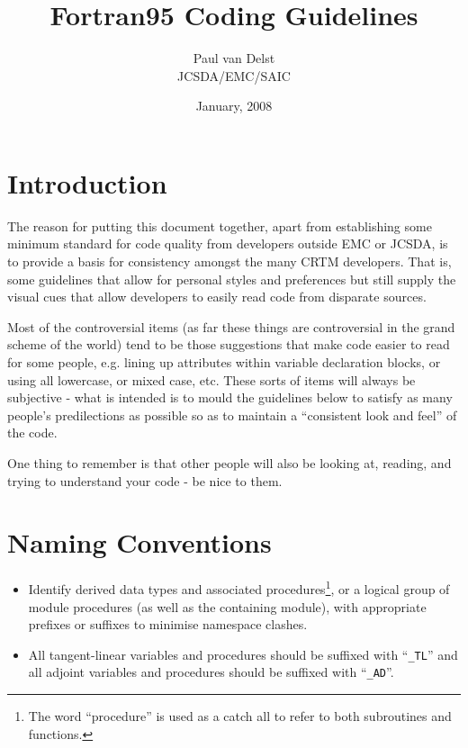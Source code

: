 

\title{Fortran95 Coding Guidelines}
\author{Paul van Delst\\JCSDA/EMC/SAIC}
\date{January, 2008}



\maketitle


\section{Introduction}
The reason for putting this document together, apart from establishing some minimum standard for code quality from developers outside EMC or JCSDA, is to provide a basis for consistency amongst the many CRTM developers. That is, some guidelines that allow for personal styles and preferences but still supply the visual cues that allow developers to easily read code from disparate sources.

Most of the controversial items (as far these things are controversial in the grand scheme of the world) tend to be those suggestions that make code easier to read for some people, e.g. lining up attributes within variable declaration blocks, or using all lowercase, or mixed case, etc. These sorts of items will always be subjective - what is intended is to mould the guidelines below to satisfy as many people's predilections as possible so as to maintain a ``consistent look and feel''
of the code.

One thing to remember is that other people will also be looking at, reading, and trying to understand your code - be nice to them.


\section{Naming Conventions}
\begin{itemize}
  \item Identify derived data types and associated procedures\footnote{The word ``procedure'' is used as a catch all to refer to both subroutines and functions.}, or a logical group of module procedures (as well as the containing module), with appropriate prefixes or suffixes to minimise namespace clashes.
  \item All tangent-linear variables and procedures should be suffixed with ``\texttt{\_TL}'' and all adjoint variables and procedures should be suffixed with ``\texttt{\_AD}''.
\end{itemize}



